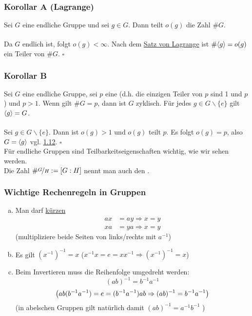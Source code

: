 \subsubsection*{Korollar A (Lagrange)}
Sei $G$ eine endliche Gruppe und sei $g\in G$. Dann teilt $o(g)$ die Zahl $\#G$.\\

\\
Da $G$ endlich ist, folgt $o(g)<\infty$. Nach dem \hyperref[sub:satz_von_lagrange]{Satz von Lagrange} ist $\#\langle g \rangle=o(g)$ ein Teiler von $\#G$.
\hfill $\square$

\subsubsection*{Korollar B}
Sei $G$ eine endliche Gruppe, sei $p$ eine   (d.h. die einzigen Teiler von $p$ sind 1 und $p$) und $p>1$. 
Wenn gilt $\#G=p$, dann ist $G$ zyklisch. 
Für jedes $g\in G \backslash\{e\}$ gilt $\langle g \rangle=G$.\\

\\
Sei $g \in G\backslash\{e\}$.
 Dann ist $o(g)>1$ und $o(g)$ teilt $p$. 
 Es folgt $o(g)=p$, also $G=\langle g \rangle$ vgl. \hyperref[sub:zyklische_gruppen]{1.12}.
\hfill $\square$\\

Für endliche Gruppen sind Teilbarkeitseigenschaften wichtig, wie wir sehen werden.\\
Die Zahl $\#\nicefrac{G}{H}:=[G:H]$ nennt man auch den .

\subsubsection*{Wichtige Rechenregeln in Gruppen}
\begin{enumerate}[(a)]
	\item Man darf \uline{kürzen}
	\begin{equation*}
	\begin{aligned}
		ax &= ay \Rightarrow x=y\\
		xa &= ya \Rightarrow x=y
	\end{aligned}
	\end{equation*}
	(multipliziere beide Seiten von links/rechts mit $a^{-1}$)
	\item Es gilt $(x^{-1})^{-1}=x$   ($x^{-1}x=e=xx^{-1} \Rightarrow (x^{-1})^{-1}=x$)
	\item Beim Invertieren muss die Reihenfolge umgedreht werden:\\
	\[
	(ab)^{-1}=b^{-1}a^{-1}
	\]
	\[
	\left( ab(b^{-1}a^{-1})=e=(b^{-1}a^{-1})ab \Rightarrow (ab)^{-1}=b^{-1}a^{-1}\right)
	\]
	(in abelschen Gruppen gilt natürlich damit $(ab)^{-1}=a^{-1}b^{-1}$ )
\end{enumerate}
